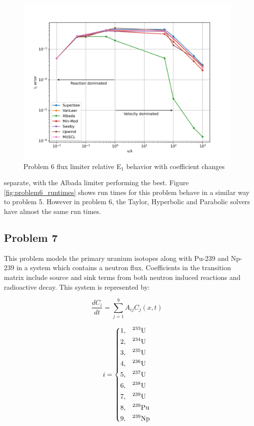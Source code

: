 \clearpage

\begin{figure}[p]
    \centering
    \includegraphics[width=6in]{images/chapter-5/progressionProblems/problem6/problem6CoefficientChanges.png}
    \caption{Problem 6 flux limiter relative E${}_{1}$ behavior with coefficient changes}
    \label{fig:problem6_l1error_coefficient_changes}
\end{figure}

\clearpage

\noindent separate, with the Albada limiter performing the best. Figure \ref{fig:problem6_runtimes} shows run times for this problem behave in a similar way to problem 5. However in problem 6, the Taylor, Hyperbolic and Parabolic solvers have almost the same run times.

\subsection{Problem 7}
This problem models the primary uranium isotopes along with Pu-239 and Np-239 in a system which contains a neutron flux. Coefficients in the transition matrix include source and sink terms from both neutron induced reactions and radioactive decay. This system is represented by:


\begin{equation}
\frac{d C_i}{dt} = \sum^9_{j = 1} A_{ij} C_j (x, t)
\end{equation}

\begin{equation}
i = \begin{dcases}
  1 , & \text{$^{233}$U}  \\
  2 , & \text{$^{234}$U}  \\
  3 , & \text{$^{235}$U}  \\
  4 , & \text{$^{236}$U}  \\
  5 , & \text{$^{237}$U}  \\
  6 , & \text{$^{238}$U}  \\
  7 , & \text{$^{239}$U}  \\
  8 , & \text{$^{239}$Pu} \\
  9 , & \text{$^{239}$Np} \\
\end{dcases}
\end{equation}

